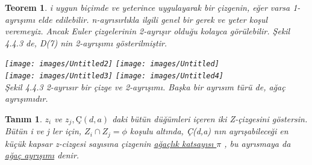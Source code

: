 \documentclass[11pt]{amsbook}
\begin{document}
\newtheorem{thm}{Teorem}[section]
\newtheorem{defn}{Tanım}[section]
\begin{thm} i uygun biçimde ve yeterince
uygulayarak bir çizgenin, eğer varsa 1-ayrışımı
elde edilebilir. n-ayrısırlıkla ilgili genel bir
gerek ve yeter koşul veremeyiz. Ancak Euler
çizgelerinin 2-ayrışır olduğu kolayca görülebilir.
Şekil 4.4.3 de, D(7) nin 2-ayrışımı
gösterilmiştir.

	\texttt{[image: images/Untitled2]}
	\texttt{[image: images/Untitled]}\\
	\texttt{[image: images/Untitled3]}
	\texttt{[image: images/Untitled4]}
	\\
	Şekil 4.4.3 2-ayrısır bir çizge ve 2-ayrışımı.
	Başka bir ayrısım türü de, ağaç ayrışımıdır.
\end{thm}

\begin{defn}
$	z_i
$
 ve
 $ z_j, Ç(d,a)
$
 daki bütün düğümleri içeren iki Z-çizgesini
	göstersin. Bütün i ve j ler için,
$ Z_i \cap Z_j =\phi
$
koşulu altında, Ç(d,a) nın
ayrışabileceği en küçük kapsar
z-cizgesi sayısına çizgenin
\underline{ağaçlık katsayısı
$ \pi
$}
, bu ayrısmaya
da \underline{ağaç ayrışımı} denir.	
\end{defn}	
\end{document}
